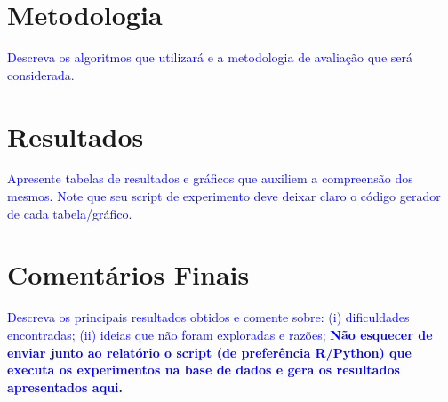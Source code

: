 \documentclass{article}
\begin{document}
\section{Metodologia}
\textcolor{blue}{
	Descreva os algoritmos que utilizará e a metodologia de avaliação que será
	considerada.
}

\section{Resultados}
\textcolor{blue}{
	Apresente tabelas de resultados e gráficos que auxiliem a compreensão dos
	mesmos.
	Note que seu script de experimento deve deixar claro o código gerador de cada tabela/gráfico.
}

\section{Comentários Finais}

\textcolor{blue}{
	Descreva os principais resultados obtidos e comente sobre:
	(i) dificuldades encontradas;
	(ii) ideias que não foram exploradas e razões;
	\textbf{Não esquecer de enviar junto ao relatório o script (de preferência R/Python) que executa os experimentos na base de dados e gera os resultados apresentados aqui.}
}
\end{document}
